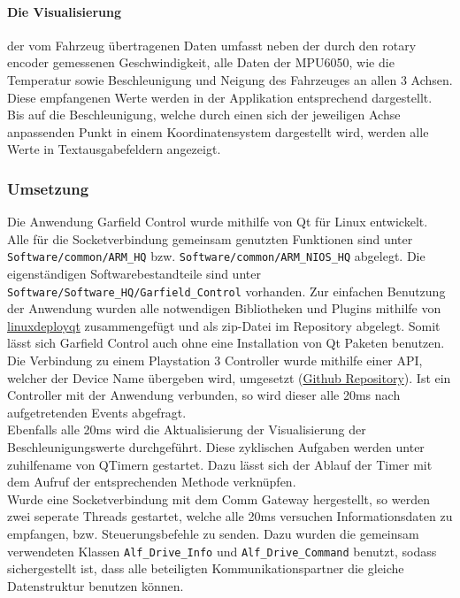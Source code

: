\paragraph{Die Visualisierung} der vom Fahrzeug übertragenen Daten umfasst neben der durch den rotary encoder gemessenen Geschwindigkeit, alle Daten der MPU6050, wie die Temperatur sowie Beschleunigung und Neigung des Fahrzeuges an allen 3 Achsen. Diese empfangenen Werte werden in der Applikation entsprechend dargestellt. Bis auf die Beschleunigung, welche durch einen sich der jeweiligen Achse anpassenden Punkt in einem Koordinatensystem dargestellt wird, werden alle Werte in Textausgabefeldern angezeigt.

\subsubsection{Umsetzung}
Die Anwendung Garfield Control wurde mithilfe von Qt für Linux entwickelt. Alle für die Socketverbindung gemeinsam genutzten Funktionen sind unter \texttt{Software/common/ARM\_HQ} bzw. \texttt{Software/common/ARM\_NIOS\_HQ} abgelegt. Die eigenständigen Softwarebestandteile sind unter \texttt{Software/Software\_HQ/Garfield\_Control} vorhanden. Zur einfachen Benutzung der Anwendung wurden alle notwendigen Bibliotheken und Plugins mithilfe von \href{https://github.com/probonopd/linuxdeployqt}{linuxdeployqt} zusammengefügt und als zip-Datei im Repository abgelegt. Somit lässt sich Garfield Control auch ohne eine Installation von Qt Paketen benutzen.\\
Die Verbindung zu einem Playstation 3 Controller wurde mithilfe einer API, welcher der Device Name übergeben wird, umgesetzt (\href{https://github.com/drewnoakes/joystick}{Github Repository}). Ist ein Controller mit der Anwendung verbunden, so wird dieser alle 20ms nach aufgetretenden Events abgefragt.\\
Ebenfalls alle 20ms wird die Aktualisierung der Visualisierung der Beschleunigungswerte durchgeführt. Diese zyklischen Aufgaben werden unter zuhilfename von QTimern gestartet. Dazu lässt sich der Ablauf der Timer mit dem Aufruf der entsprechenden Methode verknüpfen.\\
Wurde eine Socketverbindung mit dem Comm Gateway hergestellt, so werden zwei seperate Threads gestartet, welche alle 20ms versuchen Informationsdaten zu empfangen, bzw. Steuerungsbefehle zu senden. Dazu wurden die gemeinsam verwendeten Klassen \texttt{Alf\_Drive\_Info} und \texttt{Alf\_Drive\_Command} benutzt, sodass sichergestellt ist, dass alle beteiligten Kommunikationspartner die gleiche Datenstruktur benutzen können.